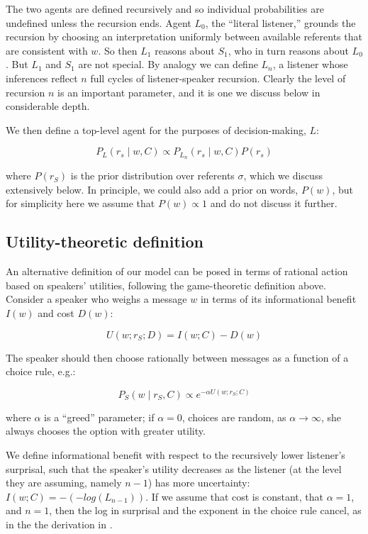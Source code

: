 \documentclass[man,noapacite]{apa2}
\begin{document}
The two agents are defined recursively and so individual probabilities are undefined unless the recursion ends.  Agent $L_0$, the ``literal listener,'' grounds the recursion by choosing an interpretation uniformly between available referents that are consistent with $w$. So then $L_1$ reasons about $S_1$, who in turn reasons about $L_0$. But $L_1$ and $S_1$ are not special. By analogy we can define $L_n$, a listener whose inferences reflect $n$ full cycles of listener-speaker recursion. Clearly the level of recursion $n$ is an important parameter, and it is one we discuss below in considerable depth.

We then define a top-level agent for the purposes of decision-making, $L$:

\begin{equation}
P_L (r_s \mid w, C) \propto P_{L_n} (r_s \mid w, C) P(r_s)
\end{equation}

\noindent where $P(r_S)$ is the prior distribution over referents $\sigma$, which we discuss extensively below. In principle, we could also add a prior on words, $P(w)$, but for simplicity here we assume that $P(w) \propto 1$ and do not discuss it further.

\subsection{Utility-theoretic definition}

An alternative definition of our model can be posed in terms of rational action based on speakers' utilities, following the game-theoretic definition above. Consider a speaker who weighs a message $w$ in terms of its informational benefit $I(w)$ and cost $D(w)$:

\begin{equation}
U(w; r_S; D) = I(w; C) - D(w)
\end{equation}

\noindent The speaker should then choose rationally between messages as a function of a choice rule, e.g.:

\begin{equation}
P_S(w \mid r_S, C) \propto e^{-\alpha U(w;r_S; C)}
\end{equation}

\noindent where $\alpha$ is a ``greed'' parameter; if $\alpha=0$, choices are random, as $\alpha \rightarrow \infty$, she always chooses the option with greater utility.

We define informational benefit with respect to the recursively lower listener's surprisal, such that the speaker's utility decreases as the listener (at the level they are assuming, namely $n-1$) has more uncertainty: $I(w; C) = -(-log(L_{n-1}))$. If we assume that cost is constant, that $\alpha=1$, and $n=1$, then the log in surprisal and the exponent in the choice rule cancel, as in the the derivation in .
\end{document}

